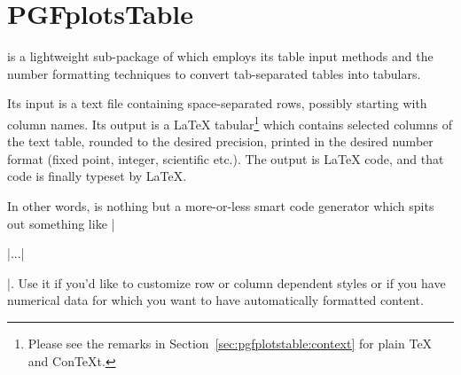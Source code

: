 

% 


\part[pgfplotstable]{PGFplotsTable}


\PGFPlotstable{} is a lightweight sub-package of \PGFPlots{} which employs its
table input methods and the number formatting techniques to convert
tab-separated tables into tabulars.

Its input is a text file containing space-separated rows, possibly starting
with column names. Its output is a \LaTeX{} tabular\footnote{Please see the
remarks in Section~\ref{sec:pgfplotstable:context} for plain \TeX{} and
Con\TeX{}t.} which contains selected columns of the text table, rounded to the
desired precision, printed in the desired number format (fixed point, integer,
scientific etc.). The output is \LaTeX{} code, and that code is finally typeset
by \LaTeX{}.

In other words, \PGFPlotstable{} is nothing but a more-or-less smart code
generator which spits out something like |\begin{tabular}|...|\end{tabular}|.
Use it if you'd like to customize row or column dependent styles or if you
have numerical data for which you want to have automatically formatted content.

